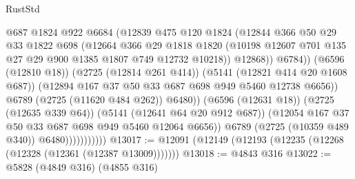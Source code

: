 \begin{lexlean}{RustStd}
\begin{coremodule}
                                      @687
                                      @1824
                                      @922
                                      @6684
                                      (@12839
                                        @475
                                        @120
                                        @1824
                                        (@12844
                                          @366
                                          @50
                                          @29
                                          @33
                                          @1822
                                          @698
                                          (@12664
                                            @366
                                            @29
                                            @1818
                                            @1820
                                            (@10198
                                              @12607
                                              @701
                                              @135
                                              @27
                                              @29
                                              @900
                                              @1385
                                              @1807
                                              @749
                                              @12732
                                              @10218))
                                          @12868))
                                      @6784))
                                  (@6596 (@12810 @18))
                                  (@2725 (@12814 @261 @414))
                                  (@5141 (@12821 @414 @20 @1608 @687))
                                  (@12894 @167 @37 @50 @33 @687 @698 @949 @5460 @12738 @6656))
                                @6789
                                (@2725 (@11620 @484 @262))
                                @6480))
                            (@6596 (@12631 @18))
                            (@2725 (@12635 @339 @64))
                            (@5141 (@12641 @64 @20 @912 @687))
                            (@12054 @167 @37 @50 @33 @687 @698 @949 @5460 @12064 @6656))
                          @6789
                          (@2725 (@10359 @489 @340))
                          @6480)))))))))))
@13017 := @12091 (@12149 (@12193 (@12235 (@12268 (@12328 (@12361 (@12387 @13009)))))))
@13018 := @4843 @316
@13022 := @5828 (@4849 @316) (@4855 @316)

\end{coremodule}
\end{lexlean}

